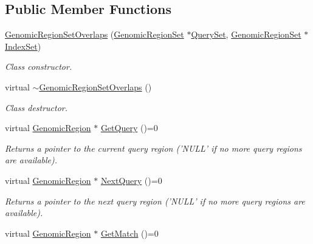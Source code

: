 \subsection*{Public Member Functions}
\begin{DoxyCompactItemize}
\item 
\hyperlink{classGenomicRegionSetOverlaps_a67c96149c0881747110db61e76f8c5de}{GenomicRegionSetOverlaps} (\hyperlink{classGenomicRegionSet}{GenomicRegionSet} $\ast$\hyperlink{classGenomicRegionSetOverlaps_ae513304379055f6d379bc5907733dbe2}{QuerySet}, \hyperlink{classGenomicRegionSet}{GenomicRegionSet} $\ast$\hyperlink{classGenomicRegionSetOverlaps_ac587bf854c827381493735b473622e03}{IndexSet})
\begin{DoxyCompactList}\small\item\em Class constructor. \end{DoxyCompactList}\item 
\hypertarget{classGenomicRegionSetOverlaps_a6d9f677e16839c931657c0200b56d99e}{
virtual \hyperlink{classGenomicRegionSetOverlaps_a6d9f677e16839c931657c0200b56d99e}{$\sim$GenomicRegionSetOverlaps} ()}
\label{classGenomicRegionSetOverlaps_a6d9f677e16839c931657c0200b56d99e}

\begin{DoxyCompactList}\small\item\em Class destructor. \end{DoxyCompactList}\item 
\hypertarget{classGenomicRegionSetOverlaps_a709ccfbe8c41154eaf590ca5aa9e12c5}{
virtual \hyperlink{classGenomicRegion}{GenomicRegion} $\ast$ \hyperlink{classGenomicRegionSetOverlaps_a709ccfbe8c41154eaf590ca5aa9e12c5}{GetQuery} ()=0}
\label{classGenomicRegionSetOverlaps_a709ccfbe8c41154eaf590ca5aa9e12c5}

\begin{DoxyCompactList}\small\item\em Returns a pointer to the current query region ('NULL' if no more query regions are available). \end{DoxyCompactList}\item 
\hypertarget{classGenomicRegionSetOverlaps_a21900a952fc925e5bc1840aff106a887}{
virtual \hyperlink{classGenomicRegion}{GenomicRegion} $\ast$ \hyperlink{classGenomicRegionSetOverlaps_a21900a952fc925e5bc1840aff106a887}{NextQuery} ()=0}
\label{classGenomicRegionSetOverlaps_a21900a952fc925e5bc1840aff106a887}

\begin{DoxyCompactList}\small\item\em Returns a pointer to the next query region ('NULL' if no more query regions are available). \end{DoxyCompactList}\item 
\hypertarget{classGenomicRegionSetOverlaps_ae6d1c3bd67b0a902649aab01909a9c10}{
virtual \hyperlink{classGenomicRegion}{GenomicRegion} $\ast$ \hyperlink{classGenomicRegionSetOverlaps_ae6d1c3bd67b0a902649aab01909a9c10}{GetMatch} ()=0}
\label{classGenomicRegionSetOverlaps_ae6d1c3bd67b0a902649aab01909a9c10}


\end{DoxyCompactItemize}
